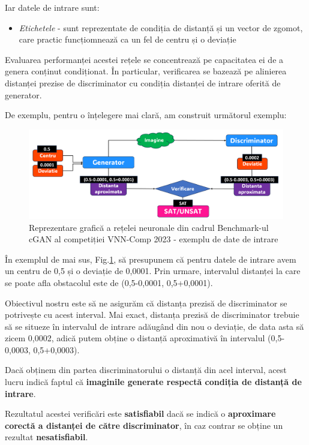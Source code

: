 Iar datele de intrare sunt:

\begin{itemize}
  \item \textit{Etichetele} -  sunt reprezentate de condiția de distanță și un vector de zgomot, care practic funcțiomnează ca un fel de centru și o deviație
\end{itemize}

Evaluarea performanței acestei rețele se concentrează pe capacitatea ei de a genera conținut condiționat. În particular, verificarea se bazează pe  alinierea distanței prezise de discriminator cu condiția distanței de intrare oferită de generator.

De exemplu, pentru o înțelegere mai clară, am construit următorul exemplu:


\begin{figure}[ht]
\centering
\includegraphics[width=12.5cm]{imagini/introducere/Ale_2.png}
\caption{Reprezentare grafică a rețelei neuronale din cadrul Benchmark-ul cGAN al competiției VNN-Comp 2023 - exemplu de date de intrare}
\label{reprezentare_grafica_cGAN_exemplu}
\end{figure}

În exemplul de mai sus, Fig.\ref{reprezentare_grafica_cGAN_exemplu}, să presupunem că pentru datele de intrare avem un centru de 0,5 și o deviație de 0,0001. Prin urmare, intervalul distanței la care se poate afla obstacolul este de (0,5-0,0001, 0,5+0,0001). 

Obiectivul nostru este să ne asigurăm că distanța prezisă de discriminator se potrivește cu acest interval. Mai exact, distanța prezisă de discriminator trebuie să se situeze în intervalul de intrare adăugând din nou o deviație, de data asta să zicem 0,0002, adică putem obține o distanță aproximativă în intervalul (0,5-0,0003, 0,5+0,0003).

Dacă obținem din partea discriminatorului o distanță din acel interval, acest lucru indică faptul că \textbf{imaginile generate respectă condiția de distanță de intrare}.

Rezultatul acestei verificări este \textbf{satisfiabil} dacă se indică o \textbf{aproximare corectă a distanței de către discriminator}, în caz contrar se obține un rezultat \textbf{nesatisfiabil}.
\newpage